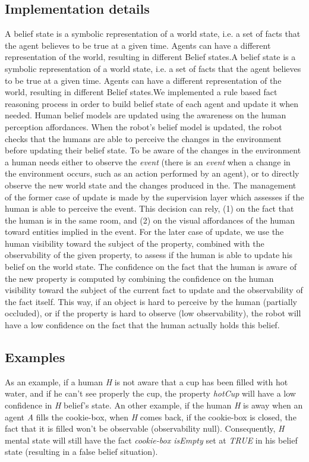 \documentclass[a4paper]{article}
\begin{document}
\subsection{Implementation details}
A belief state is a symbolic representation of a world state, i.e. a set of facts that the agent believes to be true at a given time. Agents can have a different representation of the world, resulting in different Belief states.A belief state is a symbolic representation of a world state, i.e. a set of facts that the agent believes to be true at a given time. Agents can have a different representation of the world, resulting in different Belief states.We implemented a rule based fact reasoning process in order to build belief state of each agent and update it when needed. Human belief models are updated using the awareness on the human perception affordances. When the robot's belief model is updated, the robot checks that the humans are able to perceive the changes in the environment before updating their belief state. To be aware of the changes in the environment a human needs either to observe the \textit{event} (there is an \textit{event} when a change in the environment occurs, such as an action performed by an agent), or to directly observe the new world state and the changes produced in the. The management of the former case of update is made by the supervision layer which assesses if the human is able to perceive the event. This decision can rely, (1) on the fact that the human is in the same room, and (2) on the visual affordances of the human toward entities implied in the event.
For the later case of update, we use the human visibility toward the subject of the property, combined with the observability of the given property, to assess if the human is able to update his belief on the world state. The confidence on the fact that the human is aware of the new property is computed by combining the confidence on the human visibility toward the subject of the current fact to update and the observability of the fact itself.
This way, if an object is hard to perceive by the human (partially occluded), or if the property is hard to observe (low observability), the robot will have a low confidence on the fact that the human actually holds this belief.

\subsection{Examples}
As an example, if a human \textit{H} is not aware that a cup has been filled with hot water, and if he can't see properly the cup, the property \textit{hotCup} will have a low confidence in \textit{H} belief's state.
An other example, if the human \textit{H} is away when an agent \textit{A} fills the cookie-box, when \textit{H} comes back, if the cookie-box is closed, the fact that it is filled won't be observable (observability null). Consequently, \textit{H} mental state will still have the fact \textit{cookie-box isEmpty} set at \textit{TRUE} in his belief state (resulting in a false belief situation).
\end{document}
